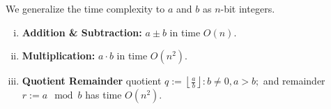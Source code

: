 \begin{theo}
    
    \label{theo:basic-arithmetic}

    We generalize the time complexity to $a$ and $b$ as $n$-bit integers. 
    \begin{enumerate}[(i)]
        \item \textbf{Addition \& Subtraction:} $a \pm b$ in time $O(n)$.
        \item \textbf{Multiplication:} $a \cdot b$ in time $O(n^2)$.
        \item \textbf{Quotient Remainder} quotient $q := \left\lfloor \frac{a}{b} \right\rfloor: b \neq 0, a>b;$ and remainder $r := a \mod b$ has time $O(n^2)$.
    \end{enumerate}
\end{theo}